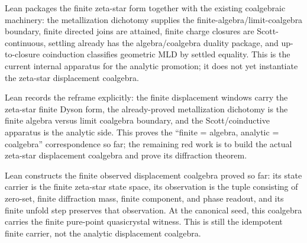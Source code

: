 \begin{theorem}
  \label{thm:zeta-star-coalgebraic-promotion-apparatus}
  \leanok
  Lean packages the finite zeta-star form together with the existing
  coalgebraic machinery: the metallization dichotomy supplies the
  finite-algebra/limit-coalgebra boundary, finite directed joins are attained,
  finite charge closures are Scott-continuous, settling already has the
  algebra/coalgebra duality package, and up-to-closure coinduction classifies
  geometric MLD by settled equality.  This is the current internal apparatus
  for the analytic promotion; it does not yet instantiate the zeta-star
  displacement coalgebra.
\end{theorem}

\begin{theorem}
  \label{thm:zeta-star-algebra-coalgebra-boundary}
  \leanok
  Lean records the reframe explicitly: the finite displacement windows carry
  the zeta-star finite Dyson form, the already-proved metallization dichotomy is
  the finite algebra versus limit coalgebra boundary, and the Scott/coinductive
  apparatus is the analytic side.  This proves the ``finite = algebra,
  analytic = coalgebra'' correspondence so far; the remaining red work is to build the actual
  zeta-star displacement coalgebra and prove its diffraction theorem.
\end{theorem}

\begin{theorem}
  \label{thm:zeta-star-finite-observed-displacement-coalgebra}
  \leanok
  Lean constructs the finite observed displacement coalgebra proved so far:
  its state carrier is the finite zeta-star state space, its observation is the
  tuple consisting of zero-set, finite diffraction mass, finite component, and
  phase readout, and its finite unfold step preserves that observation.  At the
  canonical seed, this coalgebra carries the finite pure-point quasicrystal
  witness.  This is still the idempotent finite carrier, not the analytic
  displacement coalgebra.
\end{theorem}

